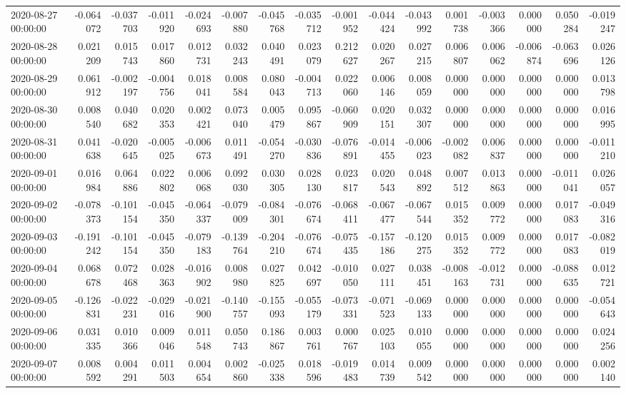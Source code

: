 \begin{tabular}{lrrrrrrrrrrrrrrr}
2020-08-27 00:00:00 & -0.064072 & -0.037703 & -0.011920 & -0.024693 & -0.007880 & -0.045768 & -0.035712 & -0.001952 & -0.044424 & -0.043992 & 0.001738 & -0.003366 & 0.000000 & 0.050284 & -0.019247 \\
2020-08-28 00:00:00 & 0.021209 & 0.015743 & 0.017860 & 0.012731 & 0.032243 & 0.040491 & 0.023079 & 0.212627 & 0.020267 & 0.027215 & 0.006807 & 0.006062 & -0.006874 & -0.063696 & 0.026126 \\
2020-08-29 00:00:00 & 0.061912 & -0.002197 & -0.004756 & 0.018041 & 0.008584 & 0.080043 & -0.004713 & 0.022060 & 0.006146 & 0.008059 & 0.000000 & 0.000000 & 0.000000 & 0.000000 & 0.013798 \\
2020-08-30 00:00:00 & 0.008540 & 0.040682 & 0.020353 & 0.002421 & 0.073040 & 0.005479 & 0.095867 & -0.060909 & 0.020151 & 0.032307 & 0.000000 & 0.000000 & 0.000000 & 0.000000 & 0.016995 \\
2020-08-31 00:00:00 & 0.041638 & -0.020645 & -0.005025 & -0.006673 & 0.011491 & -0.054270 & -0.030836 & -0.076891 & -0.014455 & -0.006023 & -0.002082 & 0.006837 & 0.000000 & 0.000000 & -0.011210 \\
2020-09-01 00:00:00 & 0.016984 & 0.064886 & 0.022802 & 0.006068 & 0.092030 & 0.030305 & 0.028130 & 0.023817 & 0.020543 & 0.048892 & 0.007512 & 0.013863 & 0.000000 & -0.011041 & 0.026057 \\
2020-09-02 00:00:00 & -0.078373 & -0.101154 & -0.045350 & -0.064337 & -0.079009 & -0.084301 & -0.076674 & -0.068411 & -0.067477 & -0.067544 & 0.015352 & 0.009772 & 0.000000 & 0.017083 & -0.049316 \\
2020-09-03 00:00:00 & -0.191242 & -0.101154 & -0.045350 & -0.079183 & -0.139764 & -0.204210 & -0.076674 & -0.075435 & -0.157186 & -0.120275 & 0.015352 & 0.009772 & 0.000000 & 0.017083 & -0.082019 \\
2020-09-04 00:00:00 & 0.068678 & 0.072468 & 0.028363 & -0.016902 & 0.008980 & 0.027825 & 0.042697 & -0.010050 & 0.027111 & 0.038451 & -0.008163 & -0.012731 & 0.000000 & -0.088635 & 0.012721 \\
2020-09-05 00:00:00 & -0.126831 & -0.022231 & -0.029016 & -0.021900 & -0.140757 & -0.155093 & -0.055179 & -0.073331 & -0.071523 & -0.069133 & 0.000000 & 0.000000 & 0.000000 & 0.000000 & -0.054643 \\
2020-09-06 00:00:00 & 0.031335 & 0.010366 & 0.009046 & 0.011548 & 0.050743 & 0.186867 & 0.003761 & 0.000767 & 0.025103 & 0.010055 & 0.000000 & 0.000000 & 0.000000 & 0.000000 & 0.024256 \\
2020-09-07 00:00:00 & 0.008592 & 0.004291 & 0.011503 & 0.004654 & 0.002860 & -0.025338 & 0.018596 & -0.019483 & 0.014739 & 0.009542 & 0.000000 & 0.000000 & 0.000000 & 0.000000 & 0.002140 \\

\end{tabular}
